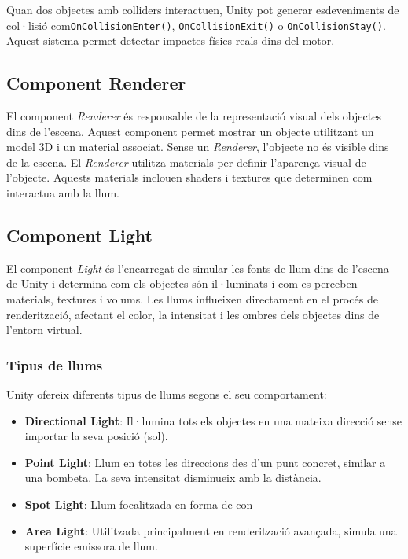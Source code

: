 \documentclass[12pt,a4paper]{report}
\begin{document}
Quan dos objectes amb colliders interactuen, Unity pot generar esdeveniments de col·lisió com\texttt{OnCollisionEnter()}, \texttt{OnCollisionExit()} o \texttt{OnCollisionStay()}. Aquest sistema permet detectar impactes físics reals dins del motor.

\subsection{Component Renderer}

El component \textit{Renderer} \cite{UnityRenderer} és responsable de la representació visual dels objectes dins de l'escena. Aquest component permet mostrar un objecte utilitzant un model 3D i un material associat. Sense un \textit{Renderer}, l'objecte no és visible dins de la escena. El \textit{Renderer} utilitza materials per definir l'aparença visual de l'objecte. Aquests materials inclouen shaders i textures que determinen com interactua amb la llum.


\subsection{Component Light}

El component \textit{Light} \cite{UnityLighting} és l'encarregat de simular les fonts de llum dins de l'escena de Unity i determina com els objectes són il·luminats i com es perceben materials, textures i volums. Les llums influeixen directament en el procés de renderització, afectant el color, la intensitat i les ombres dels objectes dins de l'entorn virtual.

\subsubsection{Tipus de llums}

Unity ofereix diferents tipus de llums segons el seu comportament:

\begin{itemize}
\item \textbf{Directional Light}: Il·lumina tots els objectes en una mateixa direcció sense importar la seva posició (sol).

\item \textbf{Point Light}: Llum en totes les direccions des d'un punt concret, similar a una bombeta. La seva intensitat disminueix amb la distància.

\item \textbf{Spot Light}: Llum focalitzada en forma de con

\item \textbf{Area Light}:  
Utilitzada principalment en renderització avançada, simula una superfície emissora de llum.
\end{itemize}
\end{document}
